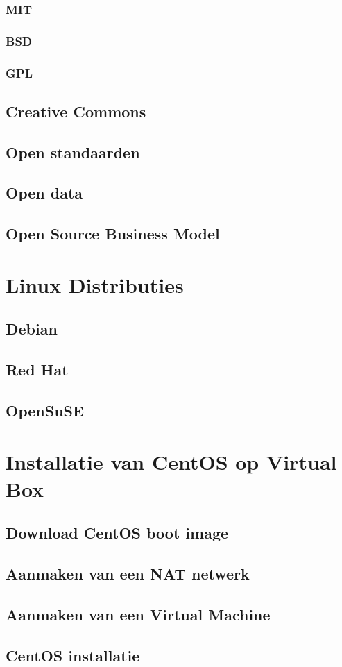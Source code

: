 \documentclass[a4paper,12pt,twoside,openright,titlepage]{book}
\begin{document}
\subsection{MIT}

\subsection{BSD}

\subsection{GPL}

\section{Creative Commons}

\section{Open standaarden}

\section{Open data}

\section{Open Source Business Model}


\chapter{Linux Distributies}

\section{Debian}

\section{Red Hat}

\section{OpenSuSE}


\chapter{Installatie van CentOS op Virtual Box}

\section{Download CentOS boot image}

\section{Aanmaken van een NAT netwerk}

\section{Aanmaken van een Virtual Machine}

\section{CentOS installatie}


\backmatter
\printindex
\end{document}

